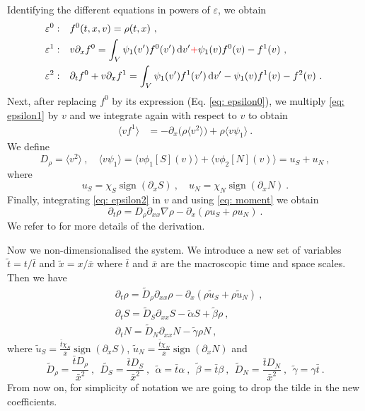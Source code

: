 \documentclass[11pt,twoside]{article}
\newcommand*\diff{\mathop{}\!\mathrm{d}}
\DeclareMathOperator{\sign}{sign}
\numberwithin{equation}{section}
\begin{document}
\noindent Identifying the different equations in powers of $\varepsilon$, we obtain
\fi
\begin{align}
    \varepsilon^0: & \quad f^0(t,{x},{v})=\rho(t,{x})\ ,\label{eq: epsilon0}\\
    \varepsilon^1: & \quad {v}\partial_x f^0=\int_V\psi_1(v')f^0(v')\diff v'\textcolor{red}{+}\psi_1(v)f^0(v)-f^1(v)\ ,\label{eq: epsilon1}\\
    \varepsilon^2: & \quad \partial_tf^0+{v}\partial_x f^1 =\int_V\psi_1(v')f^1(v')\diff v'-\psi_1(v)f^1(v)-f^2(v) \ \label{eq: epsilon2}.\
\end{align}
Next, after replacing $f^0$ by its expression (Eq. \eqref{eq: epsilon0}), we multiply \eqref{eq: epsilon1} by ${v}$ and we integrate again with respect to ${v}$ to obtain
\begin{align}
    \langle{v}f^1\rangle&=- \partial_x \big(\rho  \langle v^2\rangle \big)+\rho \langle {v}\psi_1\rangle  \ .\label{eq: mean direction}
\end{align}
We define
\begin{equation}
D_\rho=\langle v^2 \rangle\ ,\quad \langle {v}\psi_1\rangle=\langle{v}\phi_1[S]({v})\rangle+\langle{v}\phi_2[N]({v})\rangle=u_S+ u_N\ ,\label{eq: moment}\end{equation} 
where 
\begin{equation}
u_S= \chi_S\sign(\partial_x S)\ , \quad u_N=\chi_N \sign(\partial_x N)\ .
\end{equation}
Finally, integrating \eqref{eq: epsilon2} in ${v}$ and using \eqref{eq: moment} we obtain
\[
\partial_t\rho=D_\rho\partial_{xx}\nabla\rho-\partial_x(\rho u_S+\rho u_N)\ .
\]
We refer to \cite{emako2015existence,emako2016traveling} for more details of the derivation.


Now we non-dimensionalised the system. We introduce a new set of variables $\tilde{t}=t/\bar{t}$ and $\tilde{x}=x/\bar{x}$ where $\bar{t}$ and $\bar{x}$ are the macroscopic time and space scales. Then we have
\begin{align}
&\partial_t\rho =\tilde{D}_\rho\partial_{xx}\rho-\partial_x (\rho \tilde{u}_S+\rho \tilde{u}_N)\ ,\label{eq: rho nondimension}\\
&\partial_tS =\tilde{D}_S\partial_{xx} S-\tilde{\alpha} S+\tilde{\beta} \rho\ ,\\
&\partial_t N=\tilde{D}_N\partial_{xx} N-\tilde{\gamma} \rho N\ \label{eq: N nondimension},
\end{align}
where $\tilde{u}_S=\frac{\bar{t}\chi_S}{\bar{x}}\sign(\partial_x S)$, $\tilde{u}_N=\frac{\bar{t}\chi_N}{\bar{x}}\sign(\partial_x N)$ and 
\[
\tilde{D}_\rho=\frac{\bar{t}D_\rho}{\bar{x}^2}\ ,\ \ \tilde{D_S}=\frac{\bar{t}D_S}{\bar{x}^2}\ ,\ \ \tilde{\alpha}=\bar{t}\alpha\ ,\ \ \tilde{\beta}=\bar{t}\beta\ ,\ \ \tilde{D}_N=\frac{\bar{t}D_N}{\bar{x}^2}\ ,\ \ \tilde{\gamma}=\gamma \bar{t}\ .
\]
From now on, for simplicity of notation we are going to drop the tilde in the new coefficients.
\end{document}
